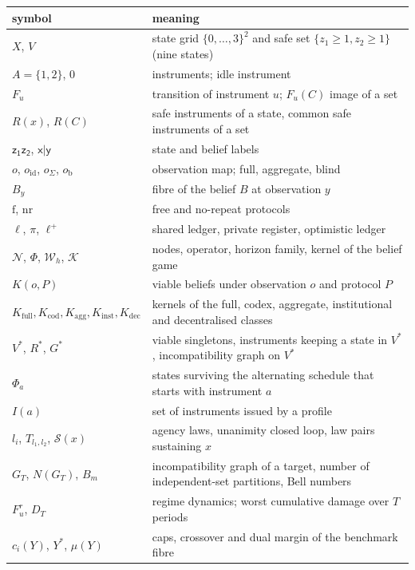\documentclass[11pt,a4paper]{article}
\theoremstyle{plain}
\theoremstyle{definition}
\theoremstyle{remark}
\newcommand{\calK}{\mathcal{K}}
\newcommand{\calN}{\mathcal{N}}
\newcommand{\calS}{\mathcal{S}}
\newcommand{\calW}{\mathcal{W}}
\newcommand{\Vstar}{V^{\ast}}
\newcommand{\Rstar}{R^{\ast}}
\newcommand{\Gstar}{G^{\ast}}
\newcommand{\st}[1]{\mathsf{#1}}
\newcommand{\led}{\ell}
\newcommand{\priv}{\pi}
\newcommand{\opt}{\ell^{+}}
\newcommand{\free}{\mathrm{f}}
\newcommand{\nr}{\mathrm{nr}}
\newcommand{\ofull}{o_{\mathrm{id}}}
\newcommand{\oagg}{o_{\Sigma}}
\newcommand{\oblind}{o_{\mathrm{b}}}
\newcommand{\Kinst}{K_{\mathrm{inst}}}
\newcommand{\Kagg}{K_{\mathrm{agg}}}
\newcommand{\Kcod}{K_{\mathrm{cod}}}
\newcommand{\Kfull}{K_{\mathrm{full}}}
\newcommand{\Kdec}{K_{\mathrm{dec}}}
\begin{document}
\begin{table}[H]
\centering\small
\begin{tabular}{@{}lp{}@{}}
\toprule
symbol & meaning \\
\midrule
$X$, $V$ & state grid $\{0,\dots,3\}^2$ and safe set $\{z_1\ge 1, z_2\ge 1\}$ (nine states) \\
$A=\{1,2\}$, $0$ & instruments; idle instrument \\
$F_u$ & transition of instrument $u$; $F_u(C)$ image of a set \\
$R(x)$, $R(C)$ & safe instruments of a state, common safe instruments of a set \\
$\st{z_1z_2}$, $\st{x|y}$ & state and belief labels \\
$o$, $\ofull$, $\oagg$, $\oblind$ & observation map; full, aggregate, blind \\
$B_y$ & fibre of the belief $B$ at observation $y$ \\
$\free$, $\nr$ & free and no-repeat protocols \\
$\led$, $\priv$, $\opt$ & shared ledger, private register, optimistic ledger \\
$\calN$, $\Phi$, $\calW_h$, $\calK$ & nodes, operator, horizon family, kernel of the belief game \\
$K(o,P)$ & viable beliefs under observation $o$ and protocol $P$ \\
$\Kfull,\Kcod,\Kagg,\Kinst,\Kdec$ & kernels of the full, codex, aggregate, institutional and decentralised classes \\
$\Vstar$, $\Rstar$, $\Gstar$ & viable singletons, instruments keeping a state in $\Vstar$, incompatibility graph on $\Vstar$ \\
$\Phi_a$ & states surviving the alternating schedule that starts with instrument $a$ \\
$I(a)$ & set of instruments issued by a profile \\
$l_i$, $T_{l_1,l_2}$, $\calS(x)$ & agency laws, unanimity closed loop, law pairs sustaining $x$ \\
$G_T$, $N(G_T)$, $B_m$ & incompatibility graph of a target, number of independent-set partitions, Bell numbers \\
$F^{r}_u$, $D_T$ & regime dynamics; worst cumulative damage over $T$ periods \\
$c_i(Y)$, $Y^{\ast}$, $\mu(Y)$ & caps, crossover and dual margin of the benchmark fibre \\
\bottomrule
\end{tabular}
\end{table}
\end{document}
